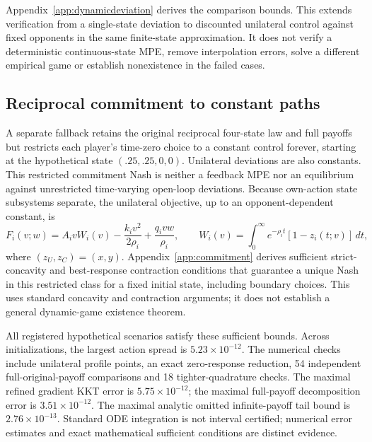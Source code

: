 \documentclass[11pt]{article}
\begin{document}
Appendix~\ref{app:dynamicdeviation} derives the comparison bounds. This extends verification from a single-state deviation to discounted unilateral control against fixed opponents in the same finite-state approximation. It does not verify a deterministic continuous-state MPE, remove interpolation errors, solve a different empirical game or establish nonexistence in the failed cases.

\subsection{Reciprocal commitment to constant paths}
A separate fallback retains the original reciprocal four-state law and full payoffs but restricts each player's time-zero choice to a constant control forever, starting at the hypothetical state $(.25,.25,0,0)$. Unilateral deviations are also constants. This restricted commitment Nash is neither a feedback MPE nor an equilibrium against unrestricted time-varying open-loop deviations. Because own-action state subsystems separate, the unilateral objective, up to an opponent-dependent constant, is
\begin{equation}
 F_i(v;w)=A_i vW_i(v)-\frac{k_i v^2}{2\rho_i}+\frac{q_i vw}{\rho_i},\qquad
 W_i(v)=\int_0^\infty e^{-\rho_i t}[1-z_i(t;v)]\,dt,
\end{equation}
where $(z_U,z_C)=(x,y)$. Appendix~\ref{app:commitment} derives sufficient strict-concavity and best-response contraction conditions that guarantee a unique Nash in this restricted class for a fixed initial state, including boundary choices. This uses standard concavity and contraction arguments; it does not establish a general dynamic-game existence theorem.

All \CommitmentScenarios{} registered hypothetical scenarios satisfy these sufficient bounds. Across \CommitmentStarts{} initializations, the largest action spread is $5.23\times10^{-12}$. The numerical checks include \CommitmentProfiles{} unilateral profile points, an exact zero-response reduction, 54 independent full-original-payoff comparisons and 18 tighter-quadrature checks. The maximal refined gradient KKT error is $5.75\times10^{-12}$; the maximal full-payoff decomposition error is $3.51\times10^{-12}$. The maximal analytic omitted infinite-payoff tail bound is $2.76\times10^{-13}$. Standard ODE integration is not interval certified; numerical error estimates and exact mathematical sufficient conditions are distinct evidence.
\end{document}
